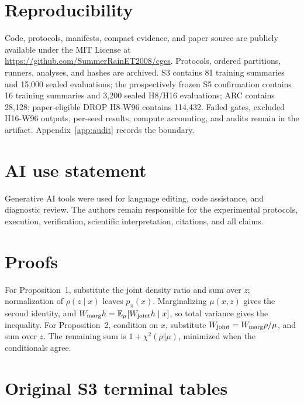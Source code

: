\documentclass[10pt]{article}
\newcommand{\terminalresults}{generated/S3_TERMINAL_RESULTS.tex}
\begin{document}
\section{Reproducibility}
Code, protocols, manifests, compact evidence, and paper source are publicly
available under the MIT License at
\url{https://github.com/SummerRainET2008/cgcs}.
Protocols, ordered partitions, runners, analyses, and hashes are archived.
S3 contains 81 training summaries and 15,000 sealed evaluations; the
prospectively frozen S5 confirmation contains 16 training summaries and 3,200
sealed H8/H16 evaluations; ARC contains 28,128; paper-eligible DROP H8-W96
contains 114,432. Failed gates, excluded H16-W96 outputs, per-seed results,
compute accounting, and audits remain in the artifact. Appendix~\ref{app:audit}
records the boundary.

\section*{AI use statement}

Generative AI tools were used for language editing, code assistance, and
diagnostic review.  The authors remain responsible for the experimental
protocols, execution, verification, scientific interpretation, citations, and
all claims.




\appendix
\section{Proofs}\label{app:proofs}
For Proposition~1, substitute the joint density ratio and sum over \(z\);
normalization of \(\rho(z\mid x)\) leaves \(p_\pi(x)\). Marginalizing
\(\mu(x,z)\) gives the second identity, and
\(W_{\rm marg}h=\mathbb E_\mu[W_{\rm joint}h\mid x]\), so total variance gives
the inequality. For Proposition~2, condition on \(x\), substitute
\(W_{\rm joint}=W_{\rm marg}\rho/\mu\), and sum over \(z\). The remaining sum is
\(1+\chi^2(\rho\Vert\mu)\), minimized when the conditionals agree.

\section{Original S3 terminal tables}\label{app:s3-terminal}

\end{document}
